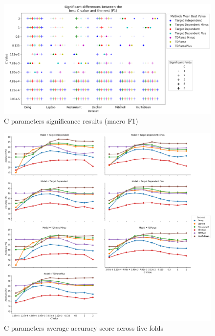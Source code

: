 \begin{figure}
    \centering
    \includegraphics[scale=0.55]{images/reproducibility/Parameters/C_Parameter/C_Sig_Plot_F1.png}
    \caption{C parameters significance results (macro F1)}
    \label{fig:repro_param_c_sig_f1}
\end{figure}
\begin{figure}[!htb]
    \centering
    \includegraphics[scale=0.3]{images/reproducibility/Parameters/C_Parameter/C_Accuracy_Plot.png}
    \caption{C parameters average accuracy score across five folds}
    \label{fig:repro_param_c_avg_acc}
\end{figure}
